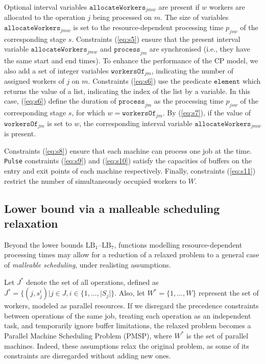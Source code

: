 \documentclass[a4paper,final]{article}
\begin{document}
        Optional interval variables $\texttt{allocateWorkers}_{jmw}$ are present if $w$ workers are allocated to the operation $j$ being processed on $m$. The size of variables $\texttt{allocateWorkers}_{jmw}$ is set to the resource-dependent processing time $p_{jsw}$ of the corresponding stage $s$. Constraints (\ref{eq:s5}) ensure that the present interval variable $\texttt{allocateWorkers}_{jmw}$ and $\texttt{process}_{jm}$ are synchronised (i.e., they have the same start and end times). To enhance the performance of the CP model, we also add a set of integer variables $\texttt{workersOf}_{jm}$, indicating the number of assigned workers of $j$ on $m$. Constraints (\ref{eq:s6}) use the predicate $\texttt{element}$ which returns the value of a list, indicating the index of the list by a variable. In this case, (\ref{eq:s6}) define the duration of $\texttt{process}_{jm}$ as the processing time $p_{jsw}$ of the corresponding stage $s$, for which $w = \texttt{workersOf}_{jm}$. By (\ref{eq:s7}), if the value of $\texttt{workersOf}_{jm}$ is set to $w$, the corresponding interval variable $\texttt{allocateWorkers}_{jmw}$ is present.

        Constraints (\ref{eq:s8}) ensure that each machine can process one job at the time. \texttt{Pulse} constraints (\ref{eq:s9}) and (\ref{eq:s10}) satisfy the capacities of buffers on the entry and exit points of each machine respectively. Finally, constraints (\ref{eq:s11}) restrict the number of simultaneously occupied workers to $W$.

    \subsection{Lower bound via a malleable scheduling relaxation} \label{sec:malleable}
Beyond the lower bounds $\text{LB}_{1}$–$\text{LB}_{7}$, functions modelling resource-dependent processing times may allow for a reduction of a relaxed problem to a general case of \emph{malleable scheduling}, under realisting assumptions.

Let $J^{*}$ denote the set of all operations, defined as $J^{*} = \{(j, s^{i}_{j})|j\in J, i\in \{1, ..., |S_{j}|\}$. Also, let $W^{*} = \{1, ..., W\}$ represent the set of workers, modeled as parallel resources. If we disregard the precedence constraints between operations of the same job, treating each operation as an independent task, and temporarily ignore buffer limitations, the relaxed problem  becomes a Parallel Machine Scheduling Problem (PMSP), where $W^{*}$ is the set of parallel machines. Indeed, these assumptions relax the original problem, as some of its constraints are disregarded without adding new ones.
\end{document}
